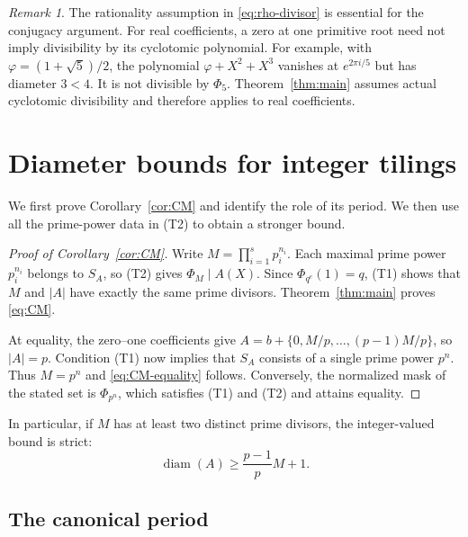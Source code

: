 \documentclass[11pt]{article}
\theoremstyle{definition}
\theoremstyle{remark}
\newtheorem{remark}[theorem]{Remark}
\numberwithin{equation}{section}
\DeclareMathOperator{\diam}{diam}
\begin{document}
\begin{remark}\label{rem:real}
The rationality assumption in \eqref{eq:rho-divisor} is essential for
the conjugacy argument. For real coefficients, a zero at one primitive
root need not imply divisibility by its cyclotomic polynomial. For
example, with $\varphi=(1+\sqrt5)/2$, the polynomial
$\varphi+X^2+X^3$ vanishes at $e^{2\pi i/5}$ but has diameter $3<4$.
It is not divisible by $\Phi_5$. Theorem~\ref{thm:main} assumes actual
cyclotomic divisibility and therefore applies to real coefficients.
\end{remark}

\section{Diameter bounds for integer tilings}\label{sec:tilings}

We first prove Corollary~\ref{cor:CM} and identify the role of its
period. We then use all the prime-power data in (T2) to obtain a
stronger bound.

\begin{proof}[Proof of Corollary~\ref{cor:CM}]
Write $M=\prod_{i=1}^sp_i^{n_i}$. Each maximal prime power $p_i^{n_i}$
belongs to $S_A$, so (T2) gives $\Phi_M\mid A(X)$.
Since $\Phi_{q^e}(1)=q$, (T1) shows that $M$ and $|A|$ have exactly
the same prime divisors. Theorem~\ref{thm:main} proves \eqref{eq:CM}.

At equality, the zero--one coefficients give
$A=b+\{0,M/p,\ldots,(p-1)M/p\}$, so $|A|=p$.
Condition (T1) now implies that $S_A$ consists of a single prime power
$p^n$. Thus $M=p^n$ and \eqref{eq:CM-equality} follows.
Conversely, the normalized mask of the stated set is $\Phi_{p^n}$,
which satisfies (T1) and (T2) and attains equality.
\end{proof}

In particular, if $M$ has at least two distinct prime divisors, the
integer-valued bound is strict:
\begin{equation}\label{eq:strict}
 \diam(A)\ge\frac{p-1}{p}M+1.
\end{equation}

\subsection{The canonical period}
\end{document}
